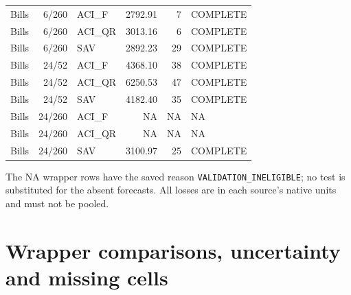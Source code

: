 \documentclass[11pt,a4paper]{article}
\begin{document}
\begin{longtable}{lrlrrl}
Bills & 6/260 & ACI\_F & 2792.91 & 7 & COMPLETE \\
Bills & 6/260 & ACI\_QR & 3013.16 & 6 & COMPLETE \\
Bills & 6/260 & SAV & 2892.23 & 29 & COMPLETE \\
Bills & 24/52 & ACI\_F & 4368.10 & 38 & COMPLETE \\
Bills & 24/52 & ACI\_QR & 6250.53 & 47 & COMPLETE \\
Bills & 24/52 & SAV & 4182.40 & 35 & COMPLETE \\
Bills & 24/260 & ACI\_F & NA & NA & NA \\
Bills & 24/260 & ACI\_QR & NA & NA & NA \\
Bills & 24/260 & SAV & 3100.97 & 25 & COMPLETE \\
\end{longtable}
\endgroup

The NA wrapper rows have the saved reason
\texttt{VALIDATION\_INELIGIBLE}; no test is substituted for the absent forecasts.
All losses are in each source's native units and must not be pooled.\section{Wrapper comparisons, uncertainty and missing cells}\label{sup:wp2-pairs}
\end{document}
